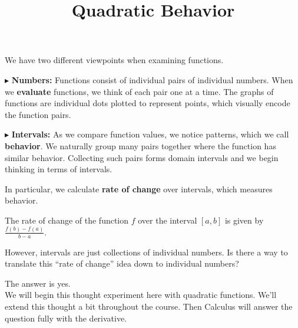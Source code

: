 \documentclass{ximera}
\title{Quadratic  Behavior}
\begin{document}
\begin{abstract}
\end{abstract}
\maketitle


 
 




We have two different viewpoints when examining functions.


$\blacktriangleright$ \textbf{Numbers:}  Functions consist of individual pairs of individual numbers.  When we \textbf{\textcolor{purple!85!blue}{evaluate}} functions, we think of each pair one at a time.  The graphs of functions are individual dots plotted to represent points, which visually encode the function pairs. 







$\blacktriangleright$ \textbf{Intervals:} As we compare function values, we notice patterns, which we call \textbf{\textcolor{purple!85!blue}{behavior}}. We naturally group many pairs together where the function has similar behavior.  Collecting such pairs forms domain intervals and we begin thinking in terms of intervals.





In particular, we calculate \textbf{\textcolor{blue!55!black}{rate of change}} over intervals, which measures behavior. 



The rate of change of the function $f$ over the interval $[a, b]$ is given by $\frac{f(b) - f(a)}{b - a}$.




However, intervals are just collections of individual numbers.  Is there a way to translate this ``rate of change'' idea down to individual numbers?

The answer is yes.  \\


We will begin this thought experiment here with quadratic functions. We'll extend this thought a bit throughout the course. Then Calculus will answer the question fully with the derivative.
\end{document}
